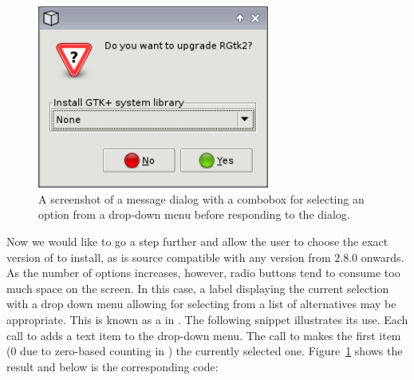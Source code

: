 \documentclass[article,shortnames]{jss}
\begin{document}
\begin{figure}[tbp]
  \begin{center}
    \includegraphics[width=3in]{combo-dialog.png}
    \caption{\label{fig:combo-dialog}A screenshot of a message dialog
with
      a 
      combobox for selecting an option from a drop-down menu before
      responding to
      the dialog.}
  \end{center}
\end{figure}

Now we would like to go a step further and allow the user to choose
the exact version of  to install, as  is source
compatible with any version from $2.8.0$ onwards. As the number of
options increases, however, radio buttons tend to consume too much
space on the screen. In this case, a label displaying the current
selection with a drop down menu allowing for selecting from a list of
alternatives may be appropriate.  This is known as a
 in . The following snippet illustrates
its use. Each call to  adds a text item to
the drop-down menu. The call to  makes the
first item ($0$ due to zero-based counting in ) the
currently selected
one. Figure~\ref{fig:combo-dialog} shows the result and below is the
corresponding code:
\end{document}
